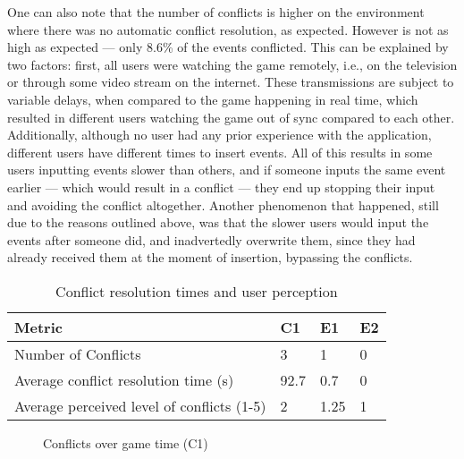 One can also note that the number of conflicts is higher on the environment where there was no automatic conflict resolution, as expected. However is not as high as expected --- only 8.6\% of the events conflicted. This can be explained by two factors: first, all users were watching the game remotely, i.e., on the television or through some video stream on the internet. These transmissions are subject to variable delays, when compared to the game happening in real time, which resulted in different users watching the game out of sync compared to each other. Additionally, although no user had any prior experience with the application, different users have different times to insert events. All of this results in some users inputting events slower than others, and if someone inputs the same event earlier --- which would result in a conflict --- they end up stopping their input and avoiding the conflict altogether. Another phenomenon that happened, still due to the reasons outlined above, was that the slower users would input the events after someone did, and inadvertedly overwrite them, since they had already received them at the moment of insertion, bypassing the conflicts.

\begin{table}
    \centering
    \caption{Conflict resolution times and user perception}
    \begin{tabular}{|l|l|l|l|}
        \hline
        \textbf{Metric}                        & \textbf{C1} & \textbf{E1} & \textbf{E2} \\ \hline \hline
        Number of Conflicts                    & 3  & 1  & 0  \\ \hline
        Average conflict resolution time (s)   & 92.7  & 0.7  & 0  \\ \hline
        Average perceived level of conflicts (1-5)     & 2  & 1.25  & 1  \\ \hline
    \end{tabular}
    \label{table:num-conflicts-time-perception}
\end{table}

\begin{figure}
    \centering
    \caption{Conflicts over game time (C1)}
    \label{chart:conflicts-over-time}
\end{figure}

